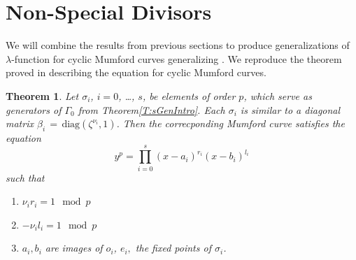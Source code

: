 \documentclass[]{amsart}
\numberwithin{equation}{section}
\newtheorem{theorem}{Theorem}[section]
\newcommand{\diag}{\mathrm{diag}}
\begin{document}
 \section{Non-Special Divisors}
 We will combine the results from previous sections to produce generalizations of $\lambda$-function for cyclic Mumford curves generalizing \cite{T}. We reproduce the  theorem proved in \cite{V1} describing the equation for cyclic Mumford curves.
 \begin{theorem}
 Let $\sigma_i$, $i=0$, \ldots, $s$, be elements of order $p$,
 which serve as generators of $\Gamma_0$ from Theorem\;\ref{T:sGenIntro}.
Each  $\sigma_i$ is similar to a diagonal matrix 
$\beta_i \,{=}\, \diag(\zeta^{\nu_i }, 1)$.
Then the correcponding Mumford curve satisfies the  equation
\begin{equation}
y^p=\prod_{i=0}^s (x-a_i)^{r_i}(x-b_i)^{l_i}
\end{equation}
 such that
 \begin{enumerate}
 \item $\nu_i r_i=1\mod p$
 \item $-\nu_i l_i=1\mod p$
 \item $a_i,b_i$ are images of  $o_i$, $e_i,$ the fixed points of $\sigma_i$. 
 \end{enumerate}
 \end{theorem}
\end{document}
